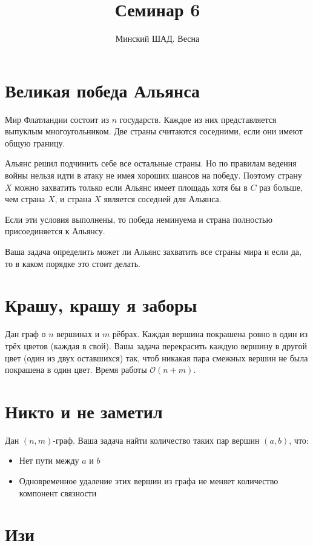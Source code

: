 \documentclass[addpoints]{exam}
\title{Семинар 6}
\author{Минский ШАД. Весна}
\begin{document}
\maketitle

\section{Великая победа Альянса}

Мир Флатландии состоит из $n$ государств. Каждое из них представляется выпуклым многоугольником. Две страны считаются соседними, если они имеют общую границу.

Альянс решил подчинить себе все остальные страны. Но по правилам ведения войны нельзя идти в атаку не имея хороших шансов на победу. Поэтому страну $X$ можно захватить только если Альянс имеет площадь хотя бы в $C$ раз больше, чем страна $X$, и страна $X$ является соседней для Альянса.

Если эти условия выполнены, то победа неминуема и страна полностью присоединяется к Альянсу.

Ваша задача определить может ли Альянс захватить все страны мира и если да, то в каком порядке это стоит делать.

\section{Крашу, крашу я заборы}

Дан граф о $n$ вершинах и $m$ рёбрах. Каждая вершина покрашена ровно в один из трёх цветов (каждая в свой). Ваша задача перекрасить каждую вершину в другой цвет (один из двух оставшихся) так, чтоб никакая пара смежных вершин не была покрашена в один цвет. Время работы $\mathcal{O}(n + m)$.

\section{Никто и не заметил}

Дан $(n,m)$-граф. Ваша задача найти количество таких пар вершин $(a,b)$, что:

\begin{itemize}
\item Нет пути между $a$ и $b$
\item Одновременное удаление этих вершин из графа не меняет количество компонент связности
\end{itemize}

\section{Изи}
\end{document}
